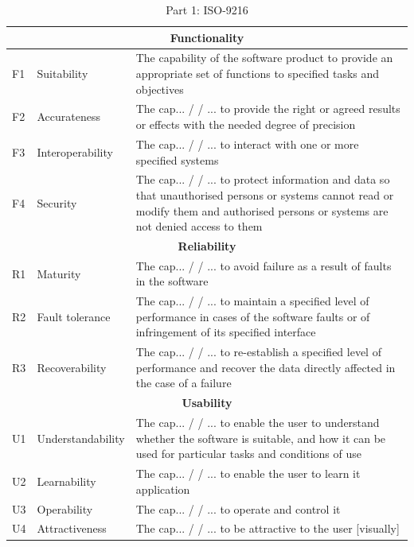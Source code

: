 \documentclass{cslthse-msc}
\begin{document}
    \begin{table}[H]
        \centering
        \caption{Part 1: ISO-9216}
        \label{tabl:standard1}
        \begin{tabularx}{\columnwidth}{|l|l|X|}
            \hline

            \multicolumn{3}{c}{\textbf{Functionality}} \\ \hline
            F1  &   Suitability &The capability of the software product to provide an appropriate set of
            functions to specified tasks and objectives \\ \hline
            F2  &   Accurateness &  The cap... / / ... to provide the right or agreed results or effects with the needed
            degree of precision \\ \hline
            F3  &   Interoperability& The cap... / / ... to interact with one or more specified systems \\ \hline
            F4  &   Security& The cap... / / ... to protect information and data so that unauthorised persons or systems
            cannot read or modify them and authorised persons or systems are not denied access to them \\ \hline

            \multicolumn{3}{c}{\textbf{Reliability}} \\ \hline
            R1  & Maturity    & The cap... / / ... to avoid failure as a result of faults in the software \\
            \hline
            R2  &   Fault tolerance & The cap... / / ... to maintain a specified level of performance in cases of the
            software faults or of infringement of its specified interface \\ \hline
            R3  &   Recoverability  & The cap... / / ... to re-establish a specified level of performance and recover the
            data directly affected in the case of a failure \\ \hline

            \multicolumn{3}{c}{\textbf{Usability}} \\ \hline
            U1  &   Understandability   &   The cap... / / ... to enable the user to understand whether the
            software is suitable, and how it can be used for particular tasks and conditions of use \\ \hline
            U2&Learnability & The cap... / / ... to enable the user to learn it application \\ \hline
            U3&Operability & The cap... / / ... to operate and control it \\ \hline
            U4&Attractiveness& The cap... / / ... to be attractive to the user [visually] \\ \hline


\end{tabularx}
\end{table}
\end{document}
